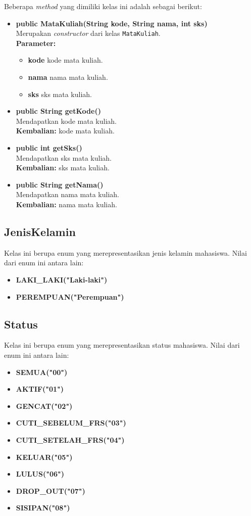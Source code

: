 Beberapa \textit{method} yang dimiliki kelas ini adalah sebagai berikut:
\begin{itemize}
	\item \textbf{public MataKuliah(String kode, String nama, int sks)}\\
	Merupakan \textit{constructor} dari kelas \texttt{MataKuliah}.\\
	\textbf{Parameter:}
	\begin{itemize}
		\item \textbf{kode} kode mata kuliah.
		\item \textbf{nama} nama mata kuliah.
		\item \textbf{sks} sks mata kuliah.
	\end{itemize}
	
	\item \textbf{public String getKode()} \\
	Mendapatkan kode mata kuliah. \\
	\textbf{Kembalian:} kode mata kuliah.
	
	\item \textbf{public int getSks()} \\
	Mendapatkan sks mata kuliah. \\
	\textbf{Kembalian:} sks mata kuliah.
	
	\item \textbf{public String getNama()} \\
	Mendapatkan nama mata kuliah. \\
	\textbf{Kembalian:} nama mata kuliah.
\end{itemize}


\subsection{JenisKelamin}
Kelas ini berupa enum yang merepresentasikan jenis kelamin mahasiswa. Nilai dari enum ini antara lain:
\begin{itemize}
	\item \textbf{LAKI\_LAKI("Laki-laki")} 
	\item \textbf{PEREMPUAN("Perempuan")}
\end{itemize}


\subsection{Status}
Kelas ini berupa enum yang merepresentasikan status mahasiswa. Nilai dari enum ini antara lain:
\begin{itemize}
	\item \textbf{SEMUA("00")} 
	\item \textbf{AKTIF("01")} 
	\item \textbf{GENCAT("02")} 
	\item \textbf{CUTI\_SEBELUM\_FRS("03")} 
	\item \textbf{CUTI\_SETELAH\_FRS("04")} 
	\item \textbf{KELUAR("05")} 
	\item \textbf{LULUS("06")} 
	\item \textbf{DROP\_OUT("07")} 
	\item \textbf{SISIPAN("08")} 
\end{itemize}
